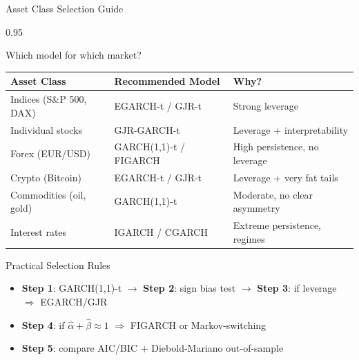 \documentclass[9pt, aspectratio=169, t]{beamer}
\begin{document}
\begin{frame}{Asset Class Selection Guide}
    \begin{cminipage}{0.95\textwidth}
    {\footnotesize
    \vspace{-0.2cm}
    \begin{block}{Which model for which market?}
        \renewcommand{\arraystretch}{1.15}
        \begin{center}
        \begin{tabular}{lll}
            \toprule
            \textbf{Asset Class} & \textbf{Recommended Model} & \textbf{Why?} \\
            \midrule
            Indices (S\&P 500, DAX) & EGARCH-t / GJR-t & Strong leverage \\
            Individual stocks & GJR-GARCH-t & Leverage + interpretability \\
            Forex (EUR/USD) & GARCH(1,1)-t / FIGARCH & High persistence, no leverage \\
            Crypto (Bitcoin) & EGARCH-t / GJR-t & Leverage + very fat tails \\
            Commodities (oil, gold) & GARCH(1,1)-t & Moderate, no clear asymmetry \\
            Interest rates & IGARCH / CGARCH & Extreme persistence, regimes \\
            \bottomrule
        \end{tabular}
        \end{center}
    \end{block}
    \vspace{-1mm}
    \begin{alertblock}{Practical Selection Rules}
        \begin{itemize}\setlength{\itemsep}{0pt}
            \item \textbf{Step 1}: GARCH(1,1)-t $\rightarrow$ \textbf{Step 2}: sign bias test $\rightarrow$ \textbf{Step 3}: if leverage $\Rightarrow$ EGARCH/GJR
            \item \textbf{Step 4}: if $\hat{\alpha}+\hat{\beta} \approx 1$ $\Rightarrow$ FIGARCH or Markov-switching
            \item \textbf{Step 5}: compare AIC/BIC + Diebold-Mariano out-of-sample
        \end{itemize}
    \end{alertblock}
    }
    \end{cminipage}
\end{frame}
\end{document}
